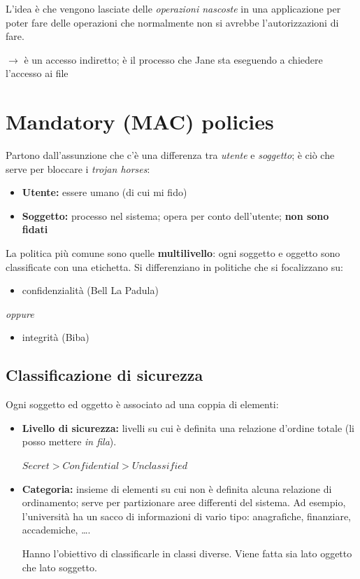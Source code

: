 \documentclass{report}
\begin{document}
\noindent L'idea è che vengono lasciate delle \textit{operazioni nascoste} in una applicazione per 
poter fare delle operazioni che normalmente non si avrebbe l'autorizzazioni di fare.

$\rightarrow$ è un accesso indiretto; è il processo che Jane sta eseguendo a chiedere l'accesso ai file



\chapter{Mandatory (MAC) policies}
\noindent Partono dall'assunzione che c'è una differenza tra \textit{utente} e \textit{soggetto}; è ciò 
che serve per bloccare i \textit{trojan horses}:
\begin{itemize}
    \item \textbf{Utente:} essere umano (di cui mi fido)
    \item \textbf{Soggetto:} processo nel sistema; opera per conto dell'utente; \textbf{non sono fidati} 
\end{itemize}

\noindent La politica più comune sono quelle \textbf{multilivello}: ogni soggetto e 
oggetto sono classificate con una etichetta. Si differenziano in politiche che si focalizzano su:
\begin{itemize}
    \item confidenzialità (Bell La Padula)
\end{itemize}

\textit{oppure}

\begin{itemize}
    \item integrità (Biba)
\end{itemize}

\section{Classificazione di sicurezza}
Ogni soggetto ed oggetto è associato ad una coppia di elementi:
\begin{itemize}
    \item \textbf{Livello di sicurezza:} livelli su cui è definita una relazione d'ordine totale (li posso mettere \textit{in fila}).
    \begin{center}
        $Secret > Confidential > Unclassified$
    \end{center}
    \item \textbf{Categoria:} insieme di elementi su cui non è definita alcuna relazione di ordinamento; serve 
    per partizionare aree differenti del sistema. Ad esempio, l'università ha un sacco di informazioni di vario 
    tipo: anagrafiche, finanziare, accademiche, \dots. 
    
    \noindent Hanno l'obiettivo di classificarle in classi diverse. Viene fatta 
    sia lato oggetto che lato soggetto.
\end{itemize}
\end{document}

